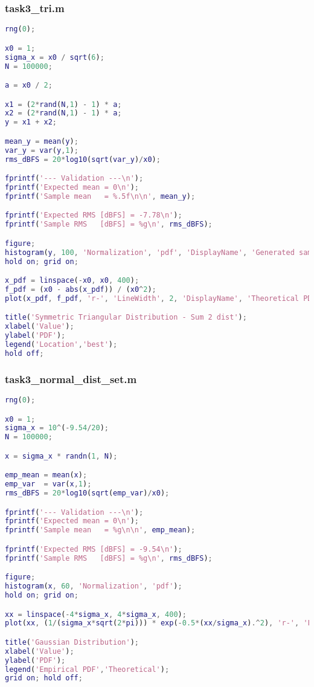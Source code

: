 \subsubsection{task3\_tri.m}
\begin{lstlisting}[language=Matlab]
rng(0);

x0 = 1;
sigma_x = x0 / sqrt(6);
N = 100000;

a = x0 / 2;

x1 = (2*rand(N,1) - 1) * a;
x2 = (2*rand(N,1) - 1) * a;
y = x1 + x2;

mean_y = mean(y);
var_y = var(y,1);
rms_dBFS = 20*log10(sqrt(var_y)/x0);

fprintf('--- Validation ---\n');
fprintf('Expected mean = 0\n');
fprintf('Sample mean   = %.5f\n\n', mean_y);

fprintf('Expected RMS [dBFS] = -7.78\n');
fprintf('Sample RMS   [dBFS] = %g\n', rms_dBFS);

figure;
histogram(y, 100, 'Normalization', 'pdf', 'DisplayName', 'Generated samples');
hold on; grid on;

x_pdf = linspace(-x0, x0, 400);
f_pdf = (x0 - abs(x_pdf)) / (x0^2);
plot(x_pdf, f_pdf, 'r-', 'LineWidth', 2, 'DisplayName', 'Theoretical PDF');

title('Symmetric Triangular Distribution - Sum 2 dist');
xlabel('Value');
ylabel('PDF');
legend('Location','best');
hold off;

\end{lstlisting}

\subsubsection{task3\_normal\_dist\_set.m}
\begin{lstlisting}[language=Matlab]
rng(0);

x0 = 1;
sigma_x = 10^(-9.54/20);
N = 100000;

x = sigma_x * randn(1, N);

emp_mean = mean(x);
emp_var  = var(x,1);
rms_dBFS = 20*log10(sqrt(emp_var)/x0);

fprintf('--- Validation ---\n');
fprintf('Expected mean = 0\n');
fprintf('Sample mean   = %g\n\n', emp_mean);

fprintf('Expected RMS [dBFS] = -9.54\n');
fprintf('Sample RMS   [dBFS] = %g\n', rms_dBFS);

figure;
histogram(x, 60, 'Normalization', 'pdf');
hold on; grid on;

xx = linspace(-4*sigma_x, 4*sigma_x, 400);
plot(xx, (1/(sigma_x*sqrt(2*pi))) * exp(-0.5*(xx/sigma_x).^2), 'r-', 'LineWidth',1.5);

title('Gaussian Distribution');
xlabel('Value');
ylabel('PDF');
legend('Empirical PDF','Theoretical');
grid on; hold off;
\end{lstlisting}

